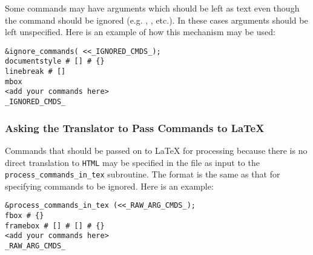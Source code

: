 Some commands may have arguments which should be left as text even
though the command should be ignored
(e.g. , , etc.).
In these cases arguments should be left unspecified.
Here is an example of how this mechanism may be used:
\begin{small}
\begin{verbatim}
&ignore_commands( <<_IGNORED_CMDS_);
documentstyle # [] # {}
linebreak # []
mbox
<add your commands here>
_IGNORED_CMDS_
\end{verbatim}
\end{small}


\subsubsection{Asking the Translator to Pass Commands to \LaTeX\label{pass}}%
\html{\\}%
Commands that should be passed on to \LaTeX{}  for processing because
there is no direct translation to \texttt{HTML} may be specified in the
file as input to the \verb|process_commands_in_tex| subroutine.
The format is the same as that for specifying commands to be ignored.
Here is an example:
\begin{small}
\begin{verbatim}
&process_commands_in_tex (<<_RAW_ARG_CMDS_);
fbox # {}
framebox # [] # [] # {}
<add your commands here>
_RAW_ARG_CMDS_
\end{verbatim}
\end{small}


